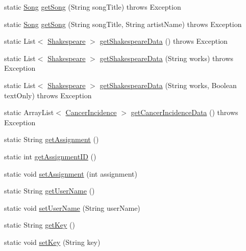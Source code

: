 \begin{DoxyCompactItemize}
\item 
static \hyperlink{classbridges_1_1data__src__dependent_1_1_song}{Song} \hyperlink{classbridges_1_1connect_1_1_bridges_a7f65e6648f9e66a02343a39f2fc425cb}{get\+Song} (String song\+Title)  throws Exception 
\item 
static \hyperlink{classbridges_1_1data__src__dependent_1_1_song}{Song} \hyperlink{classbridges_1_1connect_1_1_bridges_ae7621c3cfd9978aa02fe243317cf0cca}{get\+Song} (String song\+Title, String artist\+Name)  throws Exception 
\item 
static List$<$ \hyperlink{classbridges_1_1data__src__dependent_1_1_shakespeare}{Shakespeare} $>$ \hyperlink{classbridges_1_1connect_1_1_bridges_adc8d19f28677afb03db53736455de2d0}{get\+Shakespeare\+Data} ()  throws Exception 
\item 
static List$<$ \hyperlink{classbridges_1_1data__src__dependent_1_1_shakespeare}{Shakespeare} $>$ \hyperlink{classbridges_1_1connect_1_1_bridges_a53ac587893826c57644f2e03b33ae455}{get\+Shakespeare\+Data} (String works)  throws Exception 
\item 
static List$<$ \hyperlink{classbridges_1_1data__src__dependent_1_1_shakespeare}{Shakespeare} $>$ \hyperlink{classbridges_1_1connect_1_1_bridges_aa81c312e631bc76fa49e0ccae66679dc}{get\+Shakespeare\+Data} (String works, Boolean text\+Only)  throws Exception 
\item 
static Array\+List$<$ \hyperlink{classbridges_1_1data__src__dependent_1_1_cancer_incidence}{Cancer\+Incidence} $>$ \hyperlink{classbridges_1_1connect_1_1_bridges_ad3d3afcf9df9e2b87d069bc050029628}{get\+Cancer\+Incidence\+Data} ()  throws Exception 
\item 
static String \hyperlink{classbridges_1_1connect_1_1_bridges_af049c06c532987eb616156fb16ea2f43}{get\+Assignment} ()
\item 
static int \hyperlink{classbridges_1_1connect_1_1_bridges_ac13ed456687540b57c138adb11735d95}{get\+Assignment\+I\+D} ()
\item 
static void \hyperlink{classbridges_1_1connect_1_1_bridges_ad56c9d138965c41947bb51fe056c1cc9}{set\+Assignment} (int assignment)
\item 
static String \hyperlink{classbridges_1_1connect_1_1_bridges_a75f047cda3100e0cfa88378293c12961}{get\+User\+Name} ()
\item 
static void \hyperlink{classbridges_1_1connect_1_1_bridges_af9b9a2ca03ba02c0c2be4716594678a6}{set\+User\+Name} (String user\+Name)
\item 
static String \hyperlink{classbridges_1_1connect_1_1_bridges_a426897d6e5449601bb4e20c32b8346f5}{get\+Key} ()
\item 
static void \hyperlink{classbridges_1_1connect_1_1_bridges_ab69e89ec7d2e674a8b8c4b0be0c63397}{set\+Key} (String key)
\end{DoxyCompactItemize}


